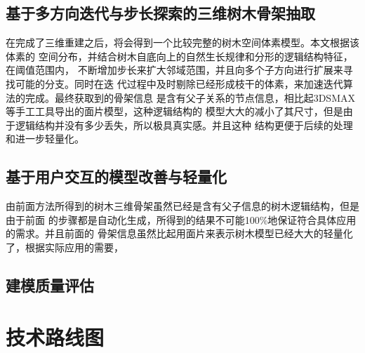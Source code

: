 \subsection{基于多方向迭代与步长探索的三维树木骨架抽取}
\label{sec:treesklextract}
在完成了三维重建之后，将会得到一个比较完整的树木空间体素模型。本文根据该体素的
空间分布，并结合树木自底向上的自然生长规律和分形的逻辑结构特征，在阈值范围内，
不断增加步长来扩大邻域范围，并且向多个子方向进行扩展来寻找可能的分支。同时在迭
代过程中及时剔除已经形成枝干的体素，来加速迭代算法的完成。最终获取到的骨架信息
是含有父子关系的节点信息，相比起3DSMAX等手工工具导出的面片模型，这种逻辑结构的
模型大大的减小了其尺寸，但是由于逻辑结构并没有多少丢失，所以极具真实感。并且这种
结构更便于后续的处理和进一步轻量化。

\subsection{基于用户交互的模型改善与轻量化}
\label{sec:userinteraction}
由前面方法所得到的树木三维骨架虽然已经是含有父子信息的树木逻辑结构，但是由于前面
的步骤都是自动化生成，所得到的结果不可能100\%地保证符合具体应用的需求。并且前面的
骨架信息虽然比起用面片来表示树木模型已经大大的轻量化了，根据实际应用的需要，

\subsection{建模质量评估}
\label{sec:qualityevaluation}

\section{技术路线图}
\label{sec:techrouteimg}

